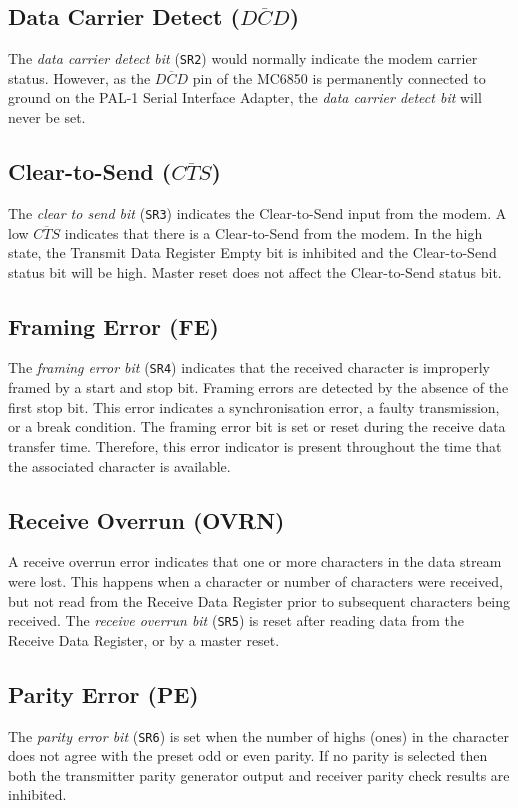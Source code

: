 \documentclass[a4paper,11pt,twoside,openright]{report}
\newcommand{\code}{\texttt}
\begin{document}
\subsection*{Data Carrier Detect ($\overline{DCD}$)}
The \textit{data carrier detect bit} (\code{SR2}) would normally indicate the modem carrier status. However, as the $\overline{DCD}$ pin of the MC6850 is permanently connected to ground on the PAL-1 Serial Interface Adapter,  the \textit{data carrier detect bit} will never be set.

\subsection*{Clear-to-Send ($\overline{CTS}$)}
The \textit{clear to send bit} (\code{SR3}) indicates the Clear-to-Send input from the modem. A low $\overline{CTS}$ indicates that there is a Clear-to-Send from the modem. In the high state, the Transmit Data Register Empty bit is inhibited and the Clear-to-Send status bit will be high. Master reset does not affect  the Clear-to-Send status bit.

\subsection*{Framing Error (FE)}
The \textit{framing error bit} (\code{SR4}) indicates that the received character is improperly framed by a start and stop bit. Framing errors are detected by the absence of the first stop bit. This error indicates a synchronisation error, a faulty transmission, or a break condition. The framing error bit is set or reset during the receive data transfer time. Therefore, this error indicator is present throughout the time that the associated character is available.

\subsection*{Receive Overrun (OVRN)}
A receive overrun error indicates that one or more characters in the data stream were lost. This happens when a character or number of characters were received, but not read from the Receive Data Register prior to subsequent characters being received. The \textit{receive overrun bit} (\code{SR5}) is reset after reading data from the Receive Data Register, or by a master reset.

\subsection*{Parity Error (PE)}
The \textit{parity error bit} (\code{SR6}) is set when the number of highs (ones) in the character does not agree with the preset odd or even parity. If no parity is selected then both the transmitter parity generator output and receiver parity check results are inhibited.
\end{document}

